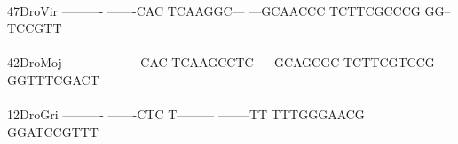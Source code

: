 \documentclass[11pt,twoside,reqno,a4paper]{article}
\begin{document}
{\hspace*{4\charwidth}\hspace*{7\charwidth}\hspace*{1\charwidth}\hspace*{1\charwidth}\hspace*{1\charwidth}\hspace*{1\charwidth}\hspace*{1\charwidth}\hspace*{1\charwidth}\\
47\hspace*{2\charwidth}DroVir	----------	-------CAC	TCAAGGC---	---GCAACCC	TCTTCGCCCG	GG--TCCGTT	\\
\hspace*{4\charwidth}\hspace*{7\charwidth}\hspace*{1\charwidth}\hspace*{1\charwidth}\hspace*{1\charwidth}\hspace*{1\charwidth}\hspace*{1\charwidth}\hspace*{1\charwidth}\\
42\hspace*{2\charwidth}DroMoj	----------	-------CAC	TCAAGCCTC-	---GCAGCGC	TCTTCGTCCG	GGTTTCGACT	\\
\hspace*{4\charwidth}\hspace*{7\charwidth}\hspace*{1\charwidth}\hspace*{1\charwidth}\hspace*{1\charwidth}\hspace*{1\charwidth}\hspace*{1\charwidth}\hspace*{1\charwidth}\\
12\hspace*{2\charwidth}DroGri	----------	-------CTC	T---------	--------TT	TTTGGGAACG	GGATCCGTTT	\\
\hspace*{4\charwidth}\hspace*{7\charwidth}\hspace*{1\charwidth}\hspace*{1\charwidth}\hspace*{1\charwidth}\hspace*{1\charwidth}\hspace*{1\charwidth}\hspace*{1\charwidth}\\
}
\end{document}
